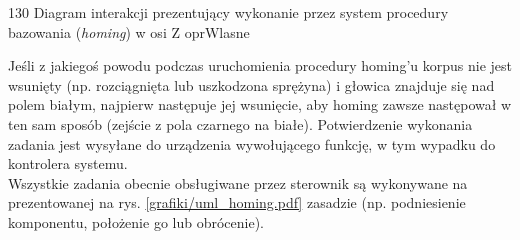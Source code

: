 	{130}
	{Diagram interakcji prezentujący wykonanie przez system procedury bazowania ({\it homing}) w osi Z}
	{oprWlasne}

Jeśli z jakiegoś powodu podczas uruchomienia procedury homing'u korpus nie jest wsunięty (np. rozciągnięta lub uszkodzona sprężyna) i głowica znajduje się nad polem białym, najpierw następuje jej wsunięcie, aby homing zawsze następował \linebreak w ten sam sposób (zejście z pola czarnego na białe). Potwierdzenie wykonania zadania jest wysyłane do urządzenia wywołującego funkcję, w tym wypadku do kontrolera systemu. \\

Wszystkie zadania obecnie obsługiwane przez sterownik są wykonywane na prezentowanej na rys. \ref{grafiki/uml_homing.pdf} zasadzie (np. podniesienie komponentu, położenie go lub obrócenie). 




